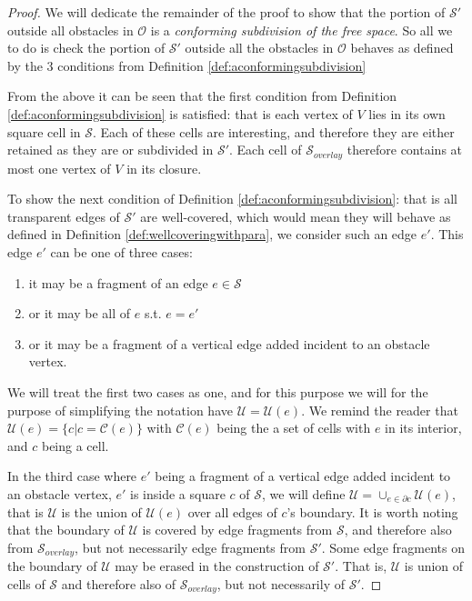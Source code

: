 \begin{proof}
We will dedicate the remainder of the proof to show that the portion of $\mathcal{S}'$ outside 
all obstacles in $\mathcal{O}$ is a \textit{conforming subdivision of the free space}. So all we
to do is check the portion of $\mathcal{S}'$ outside all the obstacles in $\mathcal{O}$ behaves 
as defined by the 3 conditions from Definition \ref{def:aconformingsubdivision}

From the above it can be seen that the first condition from Definition \ref{def:aconformingsubdivision} 
is satisfied: that is each vertex of $V$ lies in its own square cell in $\mathcal{S}$. Each of 
these cells are interesting, and therefore they are either retained as they are or subdivided
in $\mathcal{S}'$. Each cell of $\mathcal{S}_{overlay}$ therefore contains at most one vertex 
of $V$ in its closure. 

To show the next condition of Definition \ref{def:aconformingsubdivision}: that is all 
transparent edges of $\mathcal{S}'$ are well-covered, which would mean they will behave as 
defined in Definition \ref{def:wellcoveringwithpara}, we consider such an edge $e'$. This 
edge $e'$ can be one of three cases: 

\begin{enumerate}
\item it may be a fragment of an edge $e\in\mathcal{S}$
\item or it may be all of $e$ s.t. $e=e'$
\item or it may be a fragment of a vertical edge added incident to an obstacle vertex.
\end{enumerate}

We will treat the first two cases as one, and for this purpose we will for the purpose of 
simplifying the notation have $\mathcal{U}=\mathcal{U}(e)$. We remind the reader 
that $\mathcal{U}(e) = \{c|c=\mathcal{C}(e)\}$ with $\mathcal{C}(e)$ being the a set of 
cells with $e$ in its interior, and $c$ being a cell. 

In the third case where $e'$ being a fragment of a vertical edge added incident to an 
obstacle vertex, $e'$ is inside a square $c$ of $\mathcal{S}$, we will define 
$\mathcal{U}=\cup_{e\in \partial c} \mathcal{U}(e)$, that is $\mathcal{U}$ is the union 
of $\mathcal{U}(e)$ over all edges of $c$'s boundary. It is worth noting that the boundary 
of $\mathcal{U}$ is covered by edge fragments from $\mathcal{S}$, and therefore also from
$\mathcal{S}_{overlay}$, but not necessarily edge fragments from $\mathcal{S}'$. Some edge 
fragments on the boundary of $\mathcal{U}$ may be erased in the construction of $\mathcal{S}'$.
That is, $\mathcal{U}$ is union of cells of $\mathcal{S}$ and therefore also of 
$\mathcal{S}_{overlay}$, but not necessarily of $\mathcal{S}'$. 


\end{proof}
